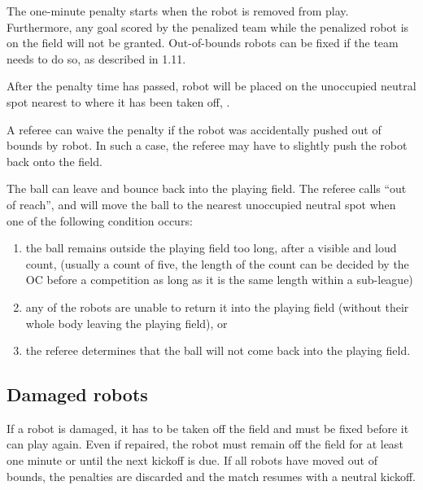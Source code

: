 \documentclass{article}
\begin{document}
The one-minute penalty starts when the robot is removed from play. Furthermore,
any goal scored by the penalized team while the penalized robot is on the field
will not be granted. Out-of-bounds robots can be fixed if the team needs to do
so, as described in 1.11.

After the penalty time has passed, robot will be placed on the unoccupied
neutral spot nearest to where it has been taken off, .

A referee can waive the penalty if the robot was accidentally pushed out of
bounds by  robot. In such a case, the
referee may have to slightly push the robot back onto the field.

The ball can leave and bounce back into the playing field. The referee calls
``out of reach'', and will move the ball to the nearest unoccupied neutral spot
when one of the following condition occurs:

\begin{enumerate}
    \item the ball remains outside the playing field too long,
        after a visible and loud count, (usually a count of five, the length of
        the count can be decided by the OC before a competition as long as it
        is the same length within a sub-league)

    \item any of the robots are unable to return it into the playing field
        (without their whole body leaving the playing field), or

    \item the referee determines that the ball will not come back into the
        playing field.

\end{enumerate}

\subsection{Damaged robots \label{ref-012}}

If a robot is damaged, it has to be taken off the field and must be fixed
before it can play again. Even if repaired, the robot must remain off the field
for at least one minute or until the next kickoff is due. If all robots have
moved out of bounds, the penalties are discarded and the match resumes with a
neutral kickoff.
\end{document}
